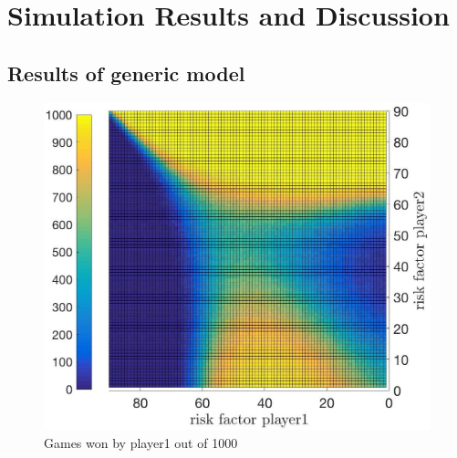 \documentclass[11pt]{article}
\begin{document}
\section{Simulation Results and Discussion}

\subsection{Results of generic model}

\begin{figure}
\begin{center}
\includegraphics[scale=0.2]{Graphics/allDataPlot_BlindOn_1000Games_001Step_TopFlat.jpg}
\caption{Games won by player1 out of 1000\label{Topview of all Data}}
\end{center}
\end{figure}
\end{document}
